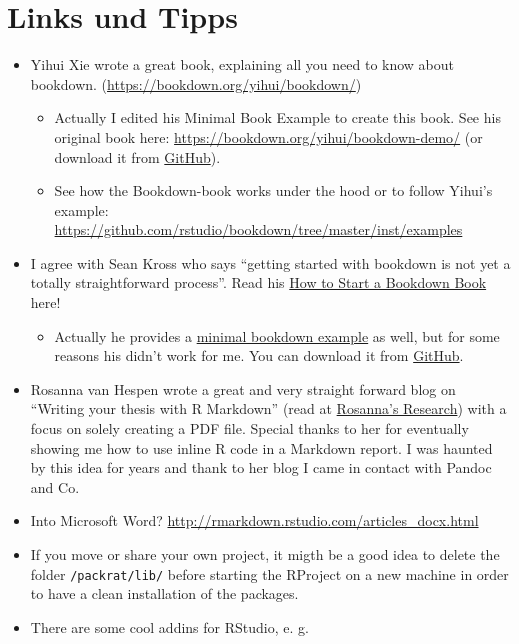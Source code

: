 \documentclass[]{book}
\providecommand{\tightlist}{%
  \setlength{\itemsep}{0pt}\setlength{\parskip}{0pt}}
\theoremstyle{definition}
\theoremstyle{definition}
\theoremstyle{remark}
\begin{document}
\hypertarget{links-und-tipps}{\section*{Links und
Tipps}\label{links-und-tipps}}

\begin{itemize}
\item
  Yihui Xie wrote a great book, explaining all you need to know about
  bookdown. (\url{https://bookdown.org/yihui/bookdown/})

  \begin{itemize}
  \tightlist
  \item
    Actually I edited his Minimal Book Example to create this book. See
    his original book here:
    \url{https://bookdown.org/yihui/bookdown-demo/} (or download it from
    \href{https://github.com/rstudio/bookdown-demo}{GitHub}).
  \item
    See how the Bookdown-book works under the hood or to follow Yihui's
    example:
    \url{https://github.com/rstudio/bookdown/tree/master/inst/examples}
  \end{itemize}
\item
  I agree with Sean Kross who says ``getting started with bookdown is
  not yet a totally straightforward process''. Read his
  \href{http://seankross.com/2016/11/17/How-to-Start-a-Bookdown-Book.html}{How
  to Start a Bookdown Book} here!

  \begin{itemize}
  \tightlist
  \item
    Actually he provides a
    \href{http://seankross.com/bookdown-start/diving-in.html}{minimal
    bookdown example} as well, but for some reasons his didn't work for
    me. You can download it from
    \href{https://github.com/seankross/bookdown-start}{GitHub}.
  \end{itemize}
\item
  Rosanna van Hespen wrote a great and very straight forward blog on
  ``Writing your thesis with R Markdown'' (read at
  \href{https://rosannavanhespenresearch.wordpress.com/2016/03/29/writing-your-thesis-with-r-markdown-4-putting-the-thesis-together/}{Rosanna's
  Research}) with a focus on solely creating a PDF file. Special thanks
  to her for eventually showing me how to use inline R code in a
  Markdown report. I was haunted by this idea for years and thank to her
  blog I came in contact with Pandoc and Co.
\item
  Into Microsoft Word?
  \url{http://rmarkdown.rstudio.com/articles_docx.html}
\item
  If you move or share your own project, it migth be a good idea to
  delete the folder \texttt{/packrat/lib/} before starting the RProject
  on a new machine in order to have a clean installation of the
  packages.
\item
  There are some cool addins for RStudio, e. g.


\end{itemize}
\end{document}
